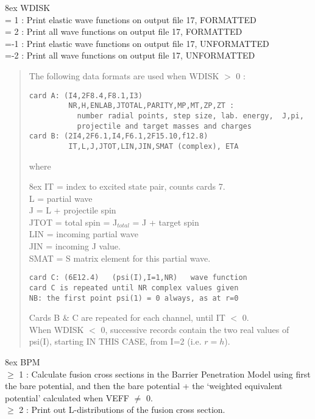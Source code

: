 \documentclass[11pt]{article}
\begin{document}
\hangindent 8ex  WDISK
\\  = 1 :  Print elastic wave functions on output file 17, FORMATTED
\\  = 2 :  Print   all   wave functions on output file 17, FORMATTED
\\  =-1 :  Print elastic wave functions on output file 17, UNFORMATTED
\\  =-2 :  Print   all   wave functions on output file 17, UNFORMATTED


\begin{quotation}
\noindent
The following data formats are used when WDISK $>$ 0 :
\begin{verbatim}
card A: (I4,2F8.4,F8.1,I3)
         NR,H,ENLAB,JTOTAL,PARITY,MP,MT,ZP,ZT :
           number radial points, step size, lab. energy,  J,pi,
           projectile and target masses and charges
card B: (2I4,2F6.1,I4,F6.1,2F15.10,f12.8)
         IT,L,J,JTOT,LIN,JIN,SMAT (complex), ETA
\end{verbatim}
where

\hangindent 8ex
IT = index to excited state pair, counts cards 7.\\
L  = partial wave\\
J  = L + projectile spin\\
JTOT = total spin = J$_{total}$ = J + target spin\\
LIN  = incoming partial wave\\
JIN  = incoming J value.\\
SMAT = S matrix element for this partial wave.\\

\begin{verbatim}
card C: (6E12.4)   (psi(I),I=1,NR)   wave function
card C is repeated until NR complex values given
NB: the first point psi(1) = 0 always, as at r=0
\end{verbatim}
Cards B \& C are repeated for each channel, until IT $<$ 0.
\\
When WDISK $<$ 0, successive records contain the two real values
of psi(I), starting IN THIS CASE, from I=2 (i.e. $r=h$).
\end{quotation}

\hangindent 8ex  BPM
\\  $\geq$ 1 : Calculate fusion cross sections in the Barrier Penetration
Model using first the bare potential, and then the bare potential + the
`weighted equivalent potential' calculated when VEFF $\neq$ 0.
\\  $\geq$ 2 : Print out L-distributions of the fusion cross section.
\end{document}

